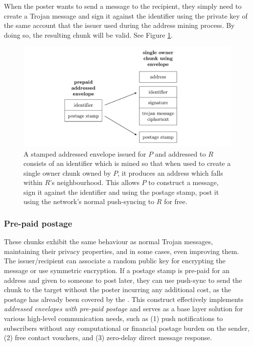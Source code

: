 When the poster wants to send a message to the recipient, they simply need to create a Trojan message and sign it against the identifier using the private key of the same account that the issuer used during the address mining process. By doing so, the resulting chunk will be valid. See Figure \ref{fig:addressed-envelope}.


\begin{figure}[htbp]
   \centering
   \includegraphics[width=\textwidth]{fig/addressed-envelope.pdf}
   \caption[Stamped addressed envelope's \statusgreen]{A stamped addressed envelope issued for $P$ and addressed to $R$ consists of an identifier which is mined so that when used to create a single owner chunk owned by $P$, it produces an address which falls within $R$'s neighbourhood. This allows $P$ to construct a message, sign it against the identifier and using the postage stamp, post it using the network's normal push-syncing to $R$ for free. }
   \label{fig:addressed-envelope}
\end{figure}

\subsubsection{Pre-paid postage}

These chunks exhibit the same behaviour as normal Trojan messages, maintaining their privacy properties, and in some cases, even improving them. The issuer/recipient can associate a random public key for encrypting the message or use symmetric encryption. If a postage stamp is pre-paid for an address and given to someone to post later, they can use push-sync to send the chunk to the target without the poster incurring any additional cost, as the postage has already been covered by the . This construct effectively implements \emph{addressed envelopes with pre-paid postage} and serves as a base layer solution for various high-level communication needs, such as (1) push notifications to subscribers without any computational or financial postage burden on the sender, (2) free contact vouchers, and (3) zero-delay direct message response.  


